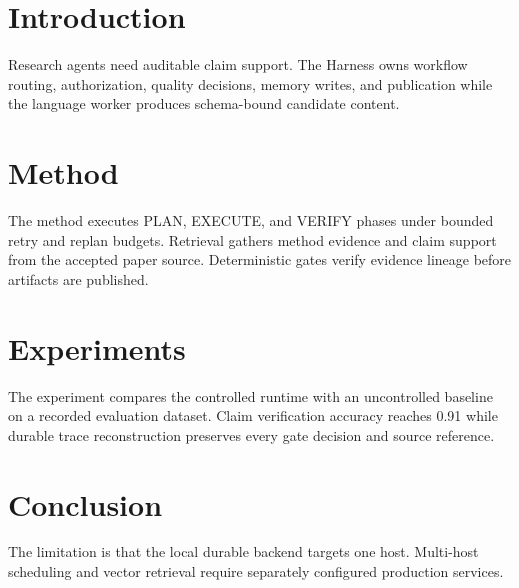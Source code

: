 \documentclass{article}
\begin{document}
\begin{abstract}
This paper presents a Harness-controlled research runtime with bounded retrieval,
deterministic verification, durable evidence, and replayable publication records.
\end{abstract}

\section{Introduction}
Research agents need auditable claim support. The Harness owns workflow routing,
authorization, quality decisions, memory writes, and publication while the language
worker produces schema-bound candidate content.

\section{Method}
The method executes PLAN, EXECUTE, and VERIFY phases under bounded retry and replan
budgets. Retrieval gathers method evidence and claim support from the accepted paper
source. Deterministic gates verify evidence lineage before artifacts are published.

\section{Experiments}
The experiment compares the controlled runtime with an uncontrolled baseline on a
recorded evaluation dataset. Claim verification accuracy reaches 0.91 while durable
trace reconstruction preserves every gate decision and source reference.

\section{Conclusion}
The limitation is that the local durable backend targets one host. Multi-host
scheduling and vector retrieval require separately configured production services.
\end{document}
